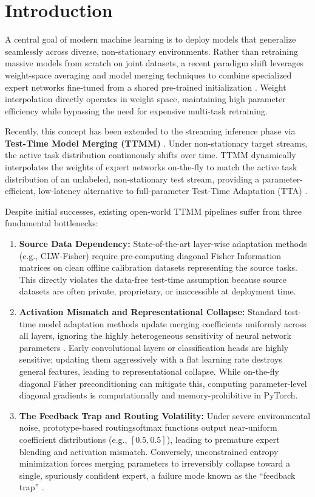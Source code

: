 \documentclass{article}
\theoremstyle{plain}
\theoremstyle{definition}
\theoremstyle{remark}
\begin{document}
\section{Introduction}
\label{sec:intro}
A central goal of modern machine learning is to deploy models that generalize seamlessly across diverse, non-stationary environments. Rather than retraining massive models from scratch on joint datasets, a recent paradigm shift leverages weight-space averaging and model merging techniques to combine specialized expert networks fine-tuned from a shared pre-trained initialization \cite{wortsman2022soups, ilharco2023task, matena2022fisher, ainsworth2023git}. Weight interpolation directly operates in weight space, maintaining high parameter efficiency while bypassing the need for expensive multi-task retraining.

Recently, this concept has been extended to the streaming inference phase via \textbf{Test-Time Model Merging (TTMM)} \cite{yang2024adamerging, hubotter2025fisher}. Under non-stationary target streams, the active task distribution continuously shifts over time. TTMM dynamically interpolates the weights of expert networks on-the-fly to match the active task distribution of an unlabeled, non-stationary test stream, providing a parameter-efficient, low-latency alternative to full-parameter Test-Time Adaptation (TTA) \cite{wang2021tent}.

Despite initial successes, existing open-world TTMM pipelines suffer from three fundamental bottlenecks:
\begin{enumerate}
    \item \textbf{Source Data Dependency:} State-of-the-art layer-wise adaptation methods (e.g., CLW-Fisher) require pre-computing diagonal Fisher Information matrices on clean offline calibration datasets representing the source tasks. This directly violates the data-free test-time assumption because source datasets are often private, proprietary, or inaccessible at deployment time.
    \item \textbf{Activation Mismatch and Representational Collapse:} Standard test-time model adaptation methods update merging coefficients uniformly across all layers, ignoring the highly heterogeneous sensitivity of neural network parameters \cite{he2016resnet}. Early convolutional layers or classification heads are highly sensitive; updating them aggressively with a flat learning rate destroys general features, leading to representational collapse. While on-the-fly diagonal Fisher preconditioning can mitigate this, computing parameter-level diagonal gradients is computationally and memory-prohibitive in PyTorch.
    \item \textbf{The Feedback Trap and Routing Volatility:} Under severe environmental noise, prototype-based routingsoftmax functions output near-uniform coefficient distributions (e.g., $[0.5, 0.5]$), leading to premature expert blending and activation mismatch. Conversely, unconstrained entropy minimization forces merging parameters to irreversibly collapse toward a single, spuriously confident expert, a failure mode known as the ``feedback trap'' \cite{zhao2024proto}.
\end{enumerate}
\end{document}

